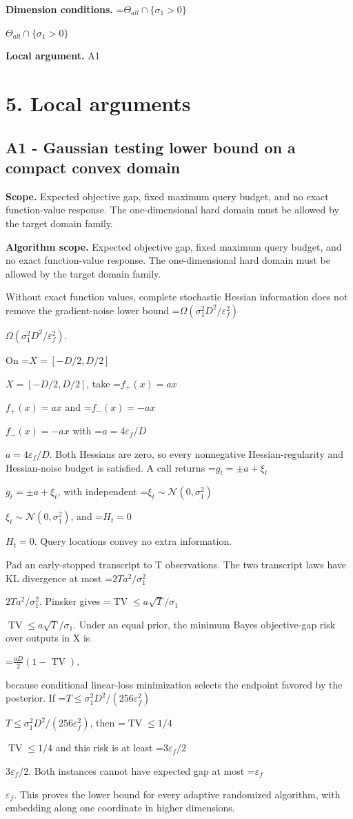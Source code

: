 \documentclass[10pt,a4paper]{article}
\newcommand{\AtlasMath}[1]{\par\begingroup\centering\setbox0=\hbox{$\displaystyle #1$}\ifdim\wd0>1.4\linewidth\typeout{ATLAS WIDE FORMULA: \the\wd0}\fi\ifdim\wd0>\linewidth\resizebox{\linewidth}{!}{\box0}\else\box0\fi\par\endgroup}
\newcommand{\AtlasInlineMath}[1]{\begingroup\setbox0=\hbox{$#1$}\ifdim\wd0>.4\linewidth\endgroup\AtlasMath{#1}\else\endgroup$#1$\fi}
\begin{document}
\textbf{Dimension conditions.} \AtlasInlineMath{\Theta_{all}\cap\{\sigma_1>0\}}

\textbf{Local argument.} A1

\section{5. Local arguments}
\subsection{A1 - Gaussian testing lower bound on a compact convex domain}
\textbf{Scope.} Expected objective gap, fixed maximum query budget, and no exact function-value response. The one-dimensional hard domain must be allowed by the target domain family.

\textbf{Algorithm scope.} Expected objective gap, fixed maximum query budget, and no exact function-value response. The one-dimensional hard domain must be allowed by the target domain family.

Without exact function values, complete stochastic Hessian information does not remove the gradient-noise lower bound \AtlasInlineMath{\Omega(\sigma_1^2D^2/\varepsilon_f^2)}.

On \AtlasInlineMath{X=[-D/2,D/2]}, take \AtlasInlineMath{f_+(x)=ax} and \AtlasInlineMath{f_-(x)=-ax} with \AtlasInlineMath{a=4\varepsilon_f/D}. Both Hessians are zero, so every nonnegative Hessian-regularity and Hessian-noise budget is satisfied. A call returns \AtlasInlineMath{g_t=\pm a+\xi_t}, with independent \AtlasInlineMath{\xi_t\sim\mathcal N(0,\sigma_1^2)}, and \AtlasInlineMath{H_t=0}. Query locations convey no extra information.

Pad an early-stopped transcript to T observations. The two transcript laws have KL divergence at most \AtlasInlineMath{2Ta^2/\sigma_1^2}. Pinsker gives \AtlasInlineMath{\operatorname{TV}\le a\sqrt T/\sigma_1}. Under an equal prior, the minimum Bayes objective-gap risk over outputs in X is

\AtlasMath{\frac{aD}{2}(1-\operatorname{TV}),}

because conditional linear-loss minimization selects the endpoint favored by the posterior. If \AtlasInlineMath{T\le\sigma_1^2D^2/(256\varepsilon_f^2)}, then \AtlasInlineMath{\operatorname{TV}\le1/4} and this risk is at least \AtlasInlineMath{3\varepsilon_f/2}. Both instances cannot have expected gap at most \AtlasInlineMath{\varepsilon_f}. This proves the lower bound for every adaptive randomized algorithm, with embedding along one coordinate in higher dimensions.
\end{document}
